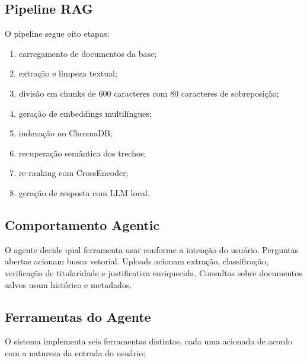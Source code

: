 \documentclass[11pt,a4paper,oneside]{article}
\begin{document}
\subsection{Pipeline RAG}

O pipeline segue oito etapas:

\begin{enumerate}[leftmargin=8mm]
  \item carregamento de documentos da base;
  \item extração e limpeza textual;
  \item divisão em chunks de 600 caracteres com 80 caracteres de sobreposição;
  \item geração de embeddings multilíngues;
  \item indexação no ChromaDB;
  \item recuperação semântica dos trechos;
  \item re-ranking com CrossEncoder;
  \item geração de resposta com LLM local.
\end{enumerate}

\subsection{Comportamento Agentic}

O agente decide qual ferramenta usar conforme a intenção do usuário. Perguntas abertas acionam busca vetorial. Uploads acionam extração, classificação, verificação de titularidade e justificativa enriquecida. Consultas sobre documentos salvos usam histórico e metadados.

\subsection{Ferramentas do Agente}

O sistema implementa seis ferramentas distintas, cada uma acionada de acordo com a natureza da entrada do usuário:
\end{document}
